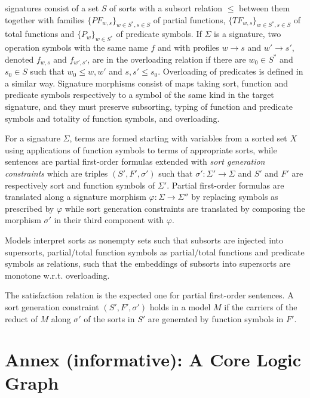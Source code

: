 \documentclass[10pt,fleqn,%
\ifpretendfinal
final%
\else
draft%
\fi,
]{scrreprt}
\newcommand{\infannex}[1]{ \chapter{Annex (informative): #1} }
\begin{document}
\CASL signatures consist of a set $S$ of sorts with a subsort relation $\leq$ between them
together with
families $\{PF_{w,s}\}_{w\in S^*, s\in S}$ of partial functions,
$\{TF_{w,s}\}_{w\in S^*, s\in S}$ of total functions and
$\{P_w\}_{w\in S^*}$ of predicate symbols. 
If $\Sigma$ is a signature, 
two operation symbols with the same name $f$ and with profiles
$w\rightarrow s$ and $w'\rightarrow s'$, denoted $f_{w,s}$ and $f_{w',s'}$, are in the
overloading relation if there are $w_0\in S^*$ and $s_0\in S$ such
that $w_0\leq w, w'$ and $s,s' \leq s_0$. Overloading of predicates is defined in a similar way.
Signature morphisms consist of maps taking sort, function and predicate symbols
respectively to a symbol of the same kind in the target signature, and they 
must preserve subsorting, typing of function and predicate symbols and totality of function symbols,
 and overloading. 

For a signature $\Sigma$, terms are formed starting with
variables from a sorted set $X$ using 
applications of function symbols to terms of appropriate sorts, while
sentences are partial first-order formulas extended with
\emph{sort generation constraints} which are triples $(S', F', \sigma')$ such that 
$\sigma':\Sigma'\rightarrow\Sigma$ and $S'$ and $F'$ are respectively sort and function symbols of
$\Sigma'$. 
Partial first-order formulas are translated along a signature morphism 
$\varphi:\Sigma\rightarrow\Sigma''$ by replacing symbols as prescribed by $\varphi$
while sort generation constraints are translated by
composing the morphism $\sigma'$ in their third component with $\varphi$.

Models interpret sorts as nonempty sets such that subsorts are injected into supersorts,
partial/total function symbols as partial/total functions and 
predicate symbols as relations,
 such that the embeddings of subsorts into
supersorts are monotone w.r.t. overloading.

The satisfaction relation is the expected one for partial first-order sentences. A sort generation
constraint $(S', F', \sigma')$ holds in a model $M$ if the carriers of the reduct of $M$ along $\sigma'$ 
of the sorts in $S'$ are generated by function symbols in $F'$.

\infannex{A Core Logic Graph}\label{a:graph}
\end{document}
